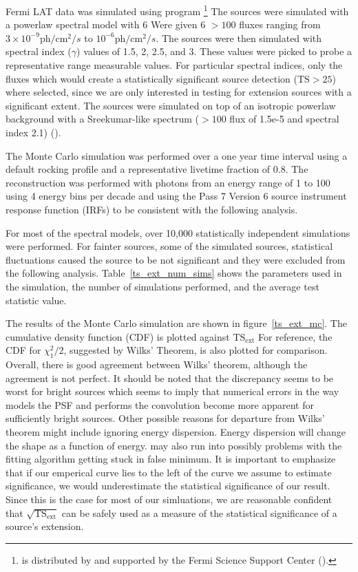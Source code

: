\documentclass[12pt,preprint]{aastex}
\newcommand{\mev}{\text{MeV}\xspace}
\newcommand{\gev}{\text{GeV}\xspace}
\newcommand{\ph}{\text{ph}\xspace}
\newcommand{\cm}{\text{cm}\xspace}
\newcommand{\tsext}{{\ensuremath{\text{TS}_\text{ext}}}\xspace}
\newcommand{\ts}{\text{TS}\xspace}
\newcommand{\pointlike}{\text{\em pointlike}\xspace}
\newcommand{\gtobssim}{\text{\em gtobssim}\xspace}
\begin{document}
Fermi LAT data was simulated using program 
\gtobssim\footnote{\gtobssim is distributed by and supported 
by the Fermi Science Support Center
(\cite{fssc}).}  The sources were simulated with a powerlaw spectral
model with 6 Were given 6 $>100$ \mev fluxes ranging from $3\times 10^{-9}
\ph/\cm^2/s$ to $10^{-6} \ph/\cm^2/s$.  The sources were then simulated
with spectral index ($\gamma$) values of 1.5, 2, 2.5, and 3.  These
values were picked to probe a representative range measurable values.
For particular spectral indices, only the fluxes which would create a
statistically significant source detection ($\ts>25$) where selected,
since we are only interested in testing for extension sources with a
significant extent. The sources were simulated on top of an isotropic
powerlaw background with a Sreekumar-like spectrum ($>100$ \mev flux
of 1.5e-5 and spectral index 2.1) (\cite{sreekumar_isotropic}).

The Monte Carlo simulation was performed over a one year time interval using
a default rocking profile and a representative
livetime fraction of 0.8.
The reconstruction was performed with photons from an energy range of
1 \gev to 100 \gev using 4 energy bins per decade and using the Pass 7 Version 6
source instrument response function (IRFs) to be consistent with the following analysis.

For most of the spectral models, over 10,000 statistically independent simulations were performed.
For fainter sources, some of the simulated sources, statistical fluctuations
caused the source to be not significant and they were excluded from the following analysis.
Table~\ref{ts_ext_num_sims} shows the parameters used in the simulation,
the number of simulations performed, and the average test statistic value.

The results of the Monte Carlo simulation are shown in
figure~\ref{ts_ext_mc}.  The cumulative density function (CDF) is plotted
against $\tsext$ For reference, the CDF for $\chi^2_1/2$,
suggested by Wilks' Theorem, is also plotted for comparison. Overall,
there is good agreement between Wilks' theorem, although the agreement is
not perfect.  It should be noted that the discrepancy seems to be worst
for bright sources which seems to imply that numerical errors in the
way \pointlike models the PSF and performs the convolution become more
apparent for sufficiently bright sources.  Other possible reasons for
departure from Wilks' theorem might include \pointlike ignoring energy
dispersion. Energy dispersion will change the shape as a function of
energy. \pointlike may also run into possibly problems with the fitting
algorithm getting stuck in false minimum. It is important to emphasize
that if
our emperical curve lies to the left of the curve we assume to estimate
significance, we would underestimate the statistical significance of
our result. Since this is the case for most of our simluations, we are
reasonable confident that $\sqrt{\tsext}$ can be safely
used as a measure of the statistical significance of a source's extension.
\end{document}
